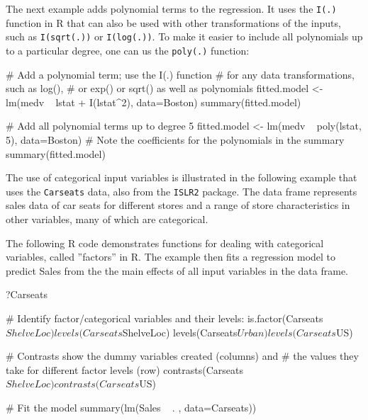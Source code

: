 The next example adds polynomial terms to the regression. It uses the \texttt{I(.)} function in R that can also be used with other transformations of the inputs, such as \texttt{I(sqrt(.))} or \texttt{I(log(.))}. To make it easier to include all polynomials up to a particular degree, one can us the \texttt{poly(.)} function:

\begin{samepage}
\begin{Rcode}
# Add a polynomial term; use the I(.) function
# for any data transformations, such as log(),
# or exp() or sqrt() as well as polynomials
fitted.model <- lm(medv ~ lstat + I(lstat^2), data=Boston)
summary(fitted.model)

# Add all polynomial terms up to degree 5
fitted.model <- lm(medv ~ poly(lstat, 5), data=Boston)
# Note the coefficients for the polynomials in the summary
summary(fitted.model)
\end{Rcode}
\end{samepage}

The use of categorical input variables is illustrated in the following example that uses the \texttt{Carseats} data, also from the \texttt{ISLR2} package. The data frame represents sales data of car seats for different stores and a range of store characteristics in other variables, many of which are categorical. 

The following R code demonstrates functions for dealing with categorical variables, called ''factors'' in R. The example then fits a regression model to predict Sales from the the main effects of all input variables in the data frame.

\begin{samepage}
\begin{Rcode}
?Carseats

# Identify factor/categorical variables and their levels:
is.factor(Carseats$ShelveLoc)
levels(Carseats$ShelveLoc)
levels(Carseats$Urban)
levels(Carseats$US)

# Contrasts show the dummy variables created (columns) and 
# the values they take for different  factor levels (row)
contrasts(Carseats$ShelveLoc)
contrasts(Carseats$US)

# Fit the model
summary(lm(Sales ~ . , data=Carseats))
\end{Rcode}
\end{samepage}

